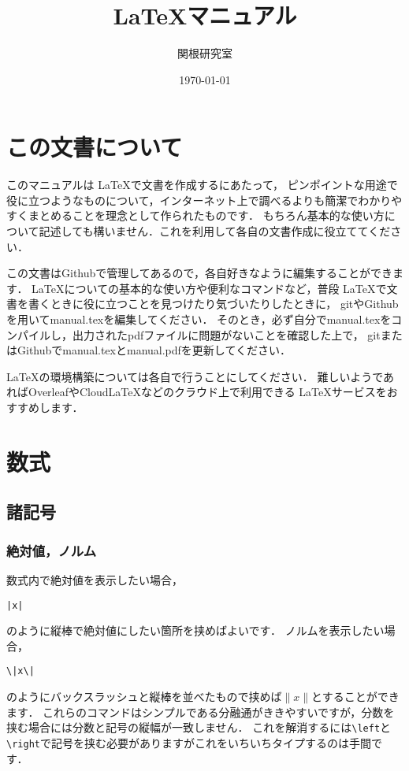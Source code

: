 \documentclass[a4paper,11pt,titlepage]{jsarticle}
\theoremstyle{definition}
\begin{document}
\title{\LaTeX マニュアル}
\author{関根研究室}
\date{\today}
\maketitle

\tableofcontents

\newpage

\section{この文書について}

このマニュアルは \LaTeX で文書を作成するにあたって，
ピンポイントな用途で役に立つようなものについて，インターネット上で調べるよりも簡潔でわかりやすくまとめることを理念として作られたものです．
もちろん基本的な使い方について記述しても構いません．これを利用して各自の文書作成に役立ててください．

この文書はGithubで管理してあるので，各自好きなように編集することができます．
\LaTeX についての基本的な使い方や便利なコマンドなど，普段 \LaTeX で文書を書くときに役に立つことを見つけたり気づいたりしたときに，
gitやGithubを用いてmanual.texを編集してください．
そのとき，必ず自分でmanual.texをコンパイルし，出力されたpdfファイルに問題がないことを確認した上で，
gitまたはGithubでmanual.texとmanual.pdfを更新してください．

\LaTeX の環境構築については各自で行うことにしてください．
難しいようであればOverleafやCloudLaTeXなどのクラウド上で利用できる \LaTeX サービスをおすすめします．

\section{数式}

\subsection{諸記号}

\subsubsection{絶対値，ノルム}

数式内で絶対値を表示したい場合，
\begin{center}
    \verb+|x|+
\end{center}
のように縦棒で絶対値にしたい箇所を挟めばよいです．
ノルムを表示したい場合，
\begin{center}
    \verb+\|x\|+
\end{center}
のようにバックスラッシュと縦棒を並べたもので挟めば$\|x\|$とすることができます．
これらのコマンドはシンプルである分融通がききやすいですが，分数を挟む場合には分数と記号の縦幅が一致しません．
これを解消するには\verb|\left|と\verb|\right|で記号を挟む必要がありますがこれをいちいちタイプするのは手間です．
\end{document}
